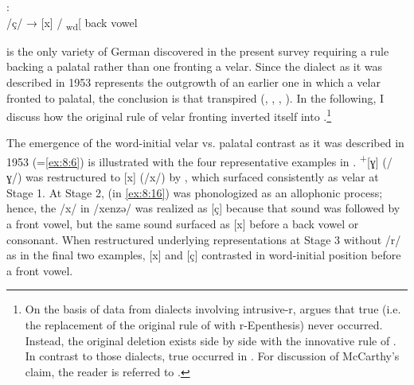 \ea%
\label{ex:8:36}:\\
  /ç/ → [x] / \textsubscript{wd}[ {\longrule}{\longrule} back vowel
\z 

 is the only variety of German discovered in the present survey requiring a rule backing a palatal rather than one fronting a velar. Since the dialect as it was described in 1953 represents the outgrowth of an earlier one in which a velar fronted to palatal, the conclusion is that  transpired (\citealt{Vennemann1972}, \citealt{McCarthy1991}, \citealt{Blevins2004}, \citealt{Hall2009a}). In the following, I discuss how the original rule of velar fronting inverted itself into .\footnote{\label{fn:8:8}On the basis of data from  dialects involving intrusive-r, \citet{McCarthy1991} argues that true  (i.e. the replacement of the original rule of  with r-Epenthesis) never occurred. Instead, the original deletion exists side by side with the innovative rule of . In contrast to those  dialects, true  occurred in . For discussion of McCarthy’s claim, the reader is referred to \citet{Hall2009a}.}

The emergence of the word-initial velar vs. palatal contrast as it was described in 1953 (=\ref{ex:8:6}) is illustrated with the four representative examples in .  \textsuperscript{+}[ɣ] (/ɣ/) was restructured to [x] (/x/) by , which surfaced consistently as velar at Stage 1. At Stage 2,  (in \ref{ex:8:16}) was phonologized as an allophonic process; hence, the /x/ in /xenzə/ was realized as [ç] because that sound was followed by a front vowel, but the same sound surfaced as [x] before a back vowel or consonant. When  restructured underlying representations at Stage 3 without /r/ as in the final two examples, [x] and [ç] contrasted in word-initial position before a front vowel.

